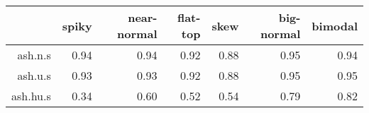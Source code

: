 \begin{tabular}{rrrrrrr}
  \toprule  & spiky & near-normal & flat-top & skew & big-normal & bimodal \\ 
  \midrule ash.n.s & 0.94 & 0.94 & 0.92 & 0.88 & 0.95 & 0.94 \\ 
  ash.u.s & 0.93 & 0.93 & 0.92 & 0.88 & 0.95 & 0.95 \\ 
  ash.hu.s & 0.34 & 0.60 & 0.52 & 0.54 & 0.79 & 0.82 \\ 
   \bottomrule \end{tabular}

